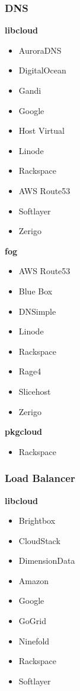 \subsubsection{DNS}
\textbf{libcloud}
\begin{multicols}{2}
\begin{itemize}
\item AuroraDNS
\item DigitalOcean
\item Gandi
\item Google
\item Host Virtual
\item Linode
\item Rackspace
\item AWS Route53
\item Softlayer
\item Zerigo
\end{itemize}
\end{multicols}

\textbf{fog}
\begin{multicols}{2}
\begin{itemize}
\item AWS Route53
\item Blue Box
\item DNSimple
\item Linode
\item Rackspace
\item Rage4
\item Slicehost
\item Zerigo
\end{itemize}
\end{multicols}

\textbf{pkgcloud}
\begin{itemize}
\item Rackspace
\end{itemize}

\subsubsection{Load Balancer}
\textbf{libcloud}
\begin{multicols}{2}
\begin{itemize}
\item Brightbox
\item CloudStack
\item DimensionData
\item Amazon
\item Google
\item GoGrid
\item Ninefold
\item Rackspace
\item Softlayer
\end{itemize}
\end{multicols}


